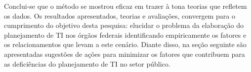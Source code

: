 Conclui-se que o método se mostrou eficaz em trazer à tona teorias que refletem os dados. Os resultados apresentados, teorias e avaliações, convergem para o cumprimento do objetivo desta pesquisa: elucidar o problema da elaboração do planejamento de TI nos órgãos federais identificando empiricamente os fatores e os relacionamentos que levam a este cenário. Diante disso, na seção seguinte são apresentadas sugestões de ações para minimizar os fatores que contribuem para as deficiências do planejamento de TI no setor público.